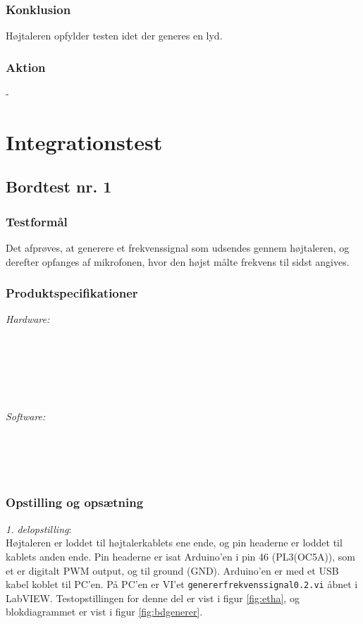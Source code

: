 		\subsubsection{Konklusion}
		Højtaleren opfylder testen idet der generes en lyd. 
		\subsubsection{Aktion}
		- 

\section{Integrationstest}

	\subsection{Bordtest nr. 1} %
	\label{bordtest1}
		\subsubsection{Testformål}
		Det afprøves, at generere et frekvenssignal som udsendes gennem højtaleren, og derefter opfanges af mikrofonen, hvor den højst målte frekvens til sidst angives.  
		\subsubsection{Produktspecifikationer}
		
		\textit{Hardware:}\\
		\\
		\\
		\pins\\
		\arduino\\
		\PC\\
		\usbkabel\\
	
		\textit{Software:}\\
		\labview\\
		\visa\\
		\vi\\
		\ardsw\
		
		\subsubsection{Opstilling og opsætning}
		\textit{1. delopstilling}:\\
		Højtaleren er loddet til højtalerkablets ene ende, og pin headerne er loddet til kablets anden ende. 
		Pin headerne er isat Arduino'en i pin 46 (PL3(OC5A)), som et er digitalt PWM output, og til ground (GND). 
		Arduino'en er med et USB kabel koblet til PC'en. 		
		På PC'en er VI'et \texttt{genererfrekvenssignal0.2.vi} åbnet i LabVIEW. Testopstillingen for denne del er vist i figur \ref{fig:etha}, og blokdiagrammet er vist i figur \ref{fig:bdgenerer}.\\ 
 
